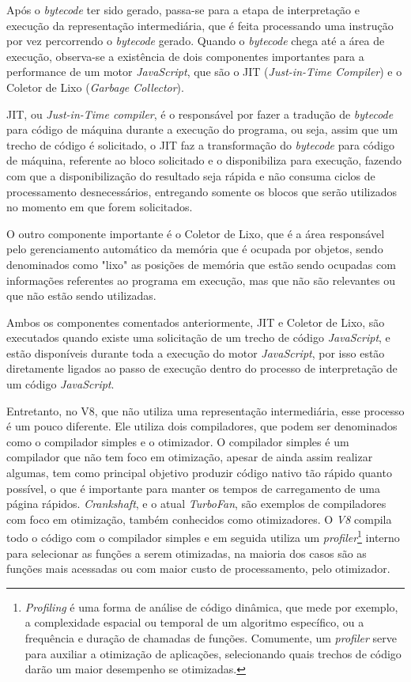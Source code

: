 Após o \textit{bytecode} ter sido gerado, passa-se para a etapa de interpretação e
execução da representação intermediária, que é feita processando uma instrução por vez
percorrendo o \textit{bytecode} gerado. Quando o \textit{bytecode} chega até a área de
execução, observa-se a existência de dois componentes importantes para a performance de um
motor \textit{JavaScript}, que são o JIT (\textit{Just-in-Time Compiler}) e o Coletor de
Lixo (\textit{Garbage Collector}).

JIT, ou \textit{Just-in-Time compiler}, é o responsável por fazer a tradução de
\textit{bytecode} para código de máquina durante a execução do programa, ou seja, assim
que um trecho de código é solicitado, o JIT faz a transformação do \textit{bytecode} para
código de máquina, referente ao bloco solicitado e o disponibiliza para execução, fazendo
com que a disponibilização do resultado seja rápida e não consuma ciclos de processamento
desnecessários, entregando somente os blocos que serão utilizados no momento em que forem
solicitados.

O outro componente importante é o Coletor de Lixo, que é a área responsável pelo
gerenciamento automático da memória que é ocupada por objetos, sendo denominados como
"lixo" as posições de memória que estão sendo ocupadas com informações referentes ao
programa em execução, mas que não são relevantes ou que não estão sendo utilizadas.

Ambos os componentes comentados anteriormente, JIT e Coletor de Lixo, são executados
quando existe uma solicitação de um trecho de código \textit{JavaScript}, e estão
disponíveis durante toda a execução do motor \textit{JavaScript}, por isso estão
diretamente ligados ao passo de execução dentro do processo de interpretação de um código
\textit{JavaScript}.

Entretanto, no V8, que não utiliza uma representação intermediária, esse processo é um
pouco diferente. Ele utiliza dois compiladores, que podem ser denominados como o
compilador simples e o otimizador. O compilador simples é um compilador que não tem foco
em otimização, apesar de ainda assim realizar algumas, tem como principal objetivo
produzir código nativo tão rápido quanto possível, o que é importante para manter os
tempos de carregamento de uma página rápidos. \textit{Crankshaft}, e o atual
\textit{TurboFan}, são exemplos de compiladores com foco em otimização, também conhecidos
como otimizadores. O \textit{V8} compila todo o código com o compilador simples e em seguida
utiliza um \textit{profiler}\footnote[1]{\textit{Profiling} é uma forma de análise de
código dinâmica, que mede por exemplo, a complexidade espacial ou temporal de um algoritmo
específico, ou a frequência e duração de chamadas de funções. Comumente, um
\textit{profiler} serve para auxiliar a otimização de aplicações, selecionando quais
trechos de código darão um maior desempenho se otimizadas.} interno para selecionar as
funções a serem otimizadas, na maioria dos casos são as funções mais acessadas ou com
maior custo de processamento, pelo otimizador.

